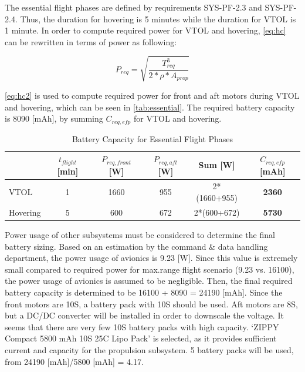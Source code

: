 {The essential flight phases are defined by requirements SYS-PF-2.3 and SYS-PF-2.4. Thus, the duration for hovering is 5 minutes while the duration for VTOL is 1 minute. In order to compute required power for VTOL and hovering, \autoref{eq:hc} can be rewritten in terms of power as following:

\begin{equation}
\label{eq:hc2}
    P_{req} = \sqrt{\frac{T_{req}^3}{2*\rho*A_{prop}}}
\end{equation}


\autoref{eq:hc2} is used to compute required power for front and aft motors during VTOL and hovering, which can be seen in \autoref{tab:essential}. The required battery capacity is 8090 [mAh], by summing $C_{req,efp}$ for VTOL and hovering.

\begin{table}[H]
\centering
\caption{Battery Capacity for Essential Flight Phases}
\label{tab:essential}
    \begin{tabular}{m{2cm}ccccc}
    \toprule
             &\bfseries $t_{flight}$ [min] &\bfseries $P_{req,front}$ [W] &\bfseries $P_{req,aft}$ [W] &\bfseries Sum [W]      &\bfseries $C_{req,efp}$ [mAh] \\\midrule
    VTOL     & 1              & 1660            & 955           & 2*(1660+955) & \textbf{2360}            \\\hdashline
    Hovering & 5              & 600             & 672           & 2*(600+672)  & \textbf{5730}  \\\bottomrule         
    \end{tabular}
\end{table}


Power usage of other subsystems must be considered to determine the final battery sizing. Based on an estimation by the command \& data handling department, the power usage of avionics is 9.23 [W]. Since this value is extremely small compared to required power for max.range flight scenario (9.23 vs. 16100), the power usage of avionics is assumed to be negligible. Then, the final required battery capacity is determined to be 16100 + 8090 = 24190 [mAh]. Since the front motors are 10S, a battery pack with 10S should be used. Aft motors are 8S, but a DC/DC converter will be installed in order to downscale the voltage. It seems that there are very few 10S battery packs with high capacity. `ZIPPY Compact 5800 mAh 10S 25C Lipo Pack' is selected, as it provides sufficient current and capacity for the propulsion subsystem. 5 battery packs will be used, from 24190 [mAh]/5800 [mAh] = 4.17.\\

}
